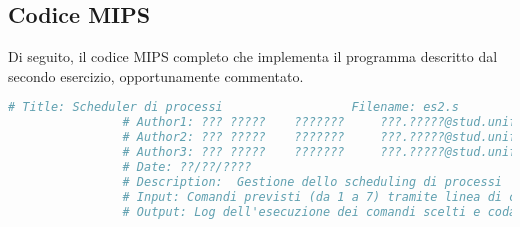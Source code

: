        	\FloatBarrier
    
    \subsection*{Codice MIPS}
    
		Di seguito, il codice MIPS completo che implementa il programma descritto dal secondo esercizio, opportunamente commentato.
		
        \begin{center}
           	\begin{lstlisting}[language=mips, gobble=14, stepnumber=1]
                # Title: Scheduler di processi                  Filename: es2.s
                # Author1: ??? ?????    ???????     ???.?????@stud.unifi.it
                # Author2: ??? ?????    ???????     ???.?????@stud.unifi.it
                # Author3: ??? ?????    ???????     ???.?????@stud.unifi.it
                # Date: ??/??/????
                # Description:  Gestione dello scheduling di processi
                # Input: Comandi previsti (da 1 a 7) tramite linea di comando
                # Output: Log dell'esecuzione dei comandi scelti e coda aggiornata
                

\end{lstlisting}
\end{center}
